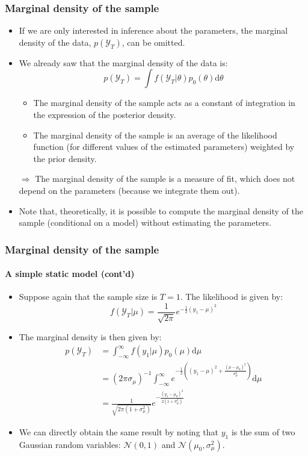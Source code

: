 \documentclass[10pt,slidestop]{beamer}
\newcommand{\normal}[2]{\mathcal N\left(#1,#2\right)}
\newcommand{\AllSample}{ \mathcal Y_T }
\begin{document}
\begin{frame}
  \frametitle{Marginal density of the sample}
  \begin{itemize}
  \item If we are only interested in inference about the parameters,
    the  marginal density of the data, $p(\AllSample)$, can be omitted.
  \item We already saw that the marginal density of the data is:
    \[
    p(\AllSample) = \int f(\AllSample|\theta)p_0(\theta)\mathrm d\theta
    \]
    \begin{itemize}
    \item The marginal density of the sample acts as a constant of
      integration in the expression of the posterior density.
    \item The marginal density of the sample is an average of the likelihood
      function (for different values of the estimated parameters)
      weighted by the prior density.
    \end{itemize}
    \bigskip
  \item[$\Rightarrow$] The marginal density of the sample is a measure
    of fit, which does not depend on the parameters (because we
    integrate them out).
    \bigskip
  \item Note that, theoretically, it is possible to compute the
    marginal density of the sample (conditional on a model) without
    estimating the parameters.
  \end{itemize}
\end{frame}


\begin{frame}
  \frametitle{Marginal density of the sample}
  \framesubtitle{A simple static model (cont'd)}
  \begin{itemize}
  \item Suppose again that the sample size is $T=1$. The likelihood is
    given by:
    \[
    f(\AllSample|\mu) = \frac{1}{\sqrt{2\pi}}e^{-\frac{1}{2}(y_1-\mu)^2}
    \]
  \item The marginal density is then given by:
    \[
    \begin{split}
      p(\AllSample) &=
      \int_{-\infty}^{\infty}f(y_1|\mu)p_0(\mu)\mathrm d\mu \\
      &=
      (2\pi\sigma_{\mu})^{-1}\int_{-\infty}^{\infty}e^{-\frac{1}{2}\left((y_1-\mu)^2+\frac{(\mu-\mu_0)^2}{\sigma_{\mu}^2}\right)}\mathrm
      d\mu\\
      &=\frac{1}{\sqrt{2\pi(1+\sigma_{\mu}^2)}}e^{-\frac{(y_1-\mu_0)^2}{2(1+\sigma_{\mu}^2)}}
    \end{split}
    \]
    \item We can directly obtain the same result by noting that $y_1$
      is the sum of two Gaussian random variables: $\normal{0}{1}$ and $\normal{\mu_0}{\sigma_{\mu}^2}$.
  \end{itemize}
\end{frame}
\end{document}
